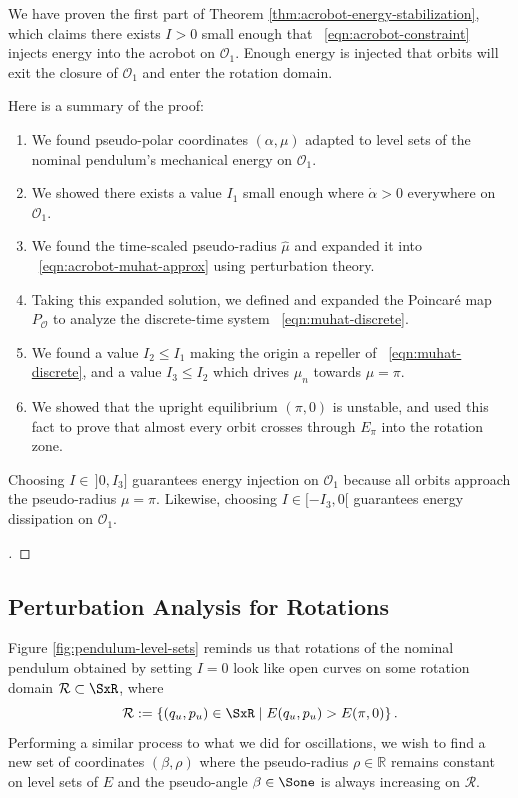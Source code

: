 We have proven the first part of Theorem \ref{thm:acrobot-energy-stabilization},
which claims there exists \(I > 0\) small enough that 
~\eqref{eqn:acrobot-constraint} injects energy into the acrobot on
\(\mathcal{O}_1\).
Enough energy is injected that orbits will exit the closure of \(\mathcal{O}_1\)
and enter the rotation domain.

Here is a summary of the proof:
\begin{enumerate}
    \item We found pseudo-polar coordinates \((\alpha,\mu)\) adapted to level
        sets of the nominal pendulum's mechanical energy on \(\mathcal{O}_1\).
    \item We showed there exists a value \(I_1\) small enough where 
        \(\dot{\alpha} > 0\) everywhere on \(\mathcal{O}_1\).
    \item We found the time-scaled pseudo-radius \(\hat{\mu}\) and
        expanded it into ~\eqref{eqn:acrobot-muhat-approx} using
        perturbation theory.
    \item Taking this expanded solution, we defined and expanded the
        Poincar\'{e} map \(P_\mathcal{O}\) to analyze the discrete-time system
        ~\eqref{eqn:muhat-discrete}.
    \item We found a value \(I_2 \leq I_1\) making the origin a repeller of 
        ~\eqref{eqn:muhat-discrete}, and a value \(I_3 \leq I_2\) which drives
        \(\mu_n\) towards \(\mu = \pi\).
    \item We showed that the upright equilibrium \((\pi,0)\) is unstable, and
        used this fact to prove that almost every orbit crosses through \(E_\pi\)
        into the rotation zone.
\end{enumerate}
Choosing \(I \in \,]0,I_3]\) guarantees energy injection on
\(\mathcal{O}_1\) because all orbits approach the pseudo-radius \(\mu = \pi\).
Likewise, choosing \(I \in [-I_3,0[\) guarantees energy dissipation on
\(\mathcal{O}_1\).

\begin{proof}[\unskip\nopunct]
\end{proof}

\subsection{Perturbation Analysis for Rotations}
Figure \ref{fig:pendulum-level-sets} reminds us that rotations of the 
nominal pendulum obtained by setting \(I = 0\) look like open curves on some
rotation domain \(\mathcal{R} \subset \SxR\), where
\[
    \mathcal{R} := \left\{ (q_u,p_u) \in \SxR \mid E(q_u,p_u) > E(\pi,0)\right\}
    .
\]
Performing a similar process to what we did for oscillations,
we wish to find a new set of coordinates \((\beta,\rho)\)
where the pseudo-radius \(\rho \in \mathbb{R}\) remains constant on level sets
of \(E\) and the pseudo-angle \(\beta \in \Sone\) is always increasing on
\(\mathcal{R}\).

